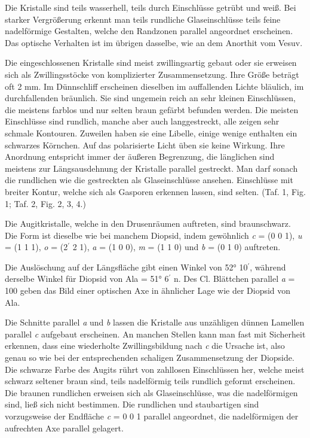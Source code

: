 \documentclass[a4paper, 11pt, oneside, polutonikogreek, german]{article}
\begin{document}
Die Kristalle sind teils wasserhell, teils durch Einschlüsse getrübt und weiß. Bei starker Vergrößerung erkennt man teils rundliche Glaseinschlüsse teils feine nadelförmige Gestalten, welche den Randzonen parallel angeordnet erscheinen. Das optische Verhalten ist im übrigen dasselbe, wie an dem Anorthit vom Vesuv.

Die eingeschlossenen Kristalle sind meist zwillingsartig gebaut oder sie erweisen sich als Zwillingsstöcke von komplizierter Zusammensetzung. Ihre Größe beträgt oft 2 mm. Im Dünnschliff erscheinen dieselben im auffallenden Lichte bläulich, im durchfallenden bräunlich. Sie sind ungemein reich an sehr kleinen Einschlüssen, die meistens farblos und nur selten braun gefärbt befunden werden. Die meisten Einschlüsse sind rundlich, manche aber auch langgestreckt, alle zeigen sehr schmale Kontouren. Zuweilen haben sie eine Libelle, einige wenige enthalten ein schwarzes Körnchen. Auf das polarisierte Licht üben sie keine Wirkung. Ihre Anordnung entspricht immer der äußeren Begrenzung, die länglichen sind meistens zur Längsausdehnung der Kristalle parallel gestreckt. Man darf sonach die rundlichen wie die gestreckten als Glaseinschlüsse ansehen. Einschlüsse mit breiter Kontur, welche sich als Gasporen erkennen lassen, sind selten. (Taf. 1, Fig. 1; Taf. 2, Fig. 2, 3, 4.)

Die Augitkristalle, welche in den Drusenräumen auftreten, sind braunschwarz. Die Form ist dieselbe wie bei manchem Diopsid, indem gewöhnlich \emph{c} = (0 0 1), \emph{u} = (1 1 1), \emph{o} = (2$^{\prime}$ 2 1), \emph{a} = (1 0 0), \emph{m} = (1 1 0) und \emph{b} = (0 1 0) auftreten.

Die Auslöschung auf der Längsfläche gibt einen Winkel von 52° 10$^{\prime}$, während derselbe Winkel für Diopsid von Ala = 51° 6$^{\prime}$ n. Des Cl. Blättchen parallel \emph{a} = 100 geben das Bild einer optischen Axe in ähnlicher Lage wie der Diopsid von Ala.

Die Schnitte parallel \emph{a} und \emph{b} lassen die Kristalle aus unzähligen dünnen Lamellen parallel \emph{c} aufgebaut erscheinen. An manchen Stellen kann man fast mit Sicherheit erkennen, dass eine wiederholte Zwillingsbildung nach \emph{c} die Ursache ist, also genau so wie bei der entsprechenden schaligen Zusammensetzung der Diopside. Die schwarze Farbe des Augits rührt von zahllosen Einschlüssen her, welche meist schwarz seltener braun sind, teils nadelförmig teils rundlich geformt erscheinen. Die braunen rundlichen erweisen sich als Glaseinschlüsse, was die nadelförmigen sind, ließ sich nicht bestimmen. Die rundlichen und staubartigen sind vorzugsweise der Endfläche \emph{c} = 0 0 1 parallel angeordnet, die nadelförmigen der aufrechten Axe parallel gelagert.
\end{document}
